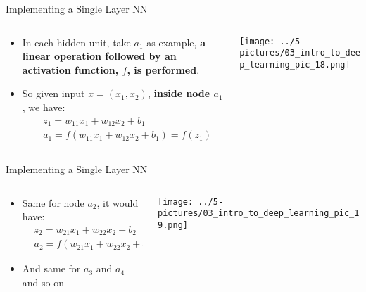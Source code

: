 \documentclass[11pt]{beamer}
\begin{document}
\begin{frame}{Implementing a Single Layer NN}
\begin{columns}[T] %
\begin{column}{.48\textwidth}
\begin{itemize}
\item In each hidden unit, take $a_1$ as example, \textbf{a linear operation followed by an activation function, $f$, is performed}. 
\item So given input $x = (x_1, x_2)$, \textbf{inside node $a_1$}, we have:
\begin{align*}
&z_1 = w_{11}x_1 + w_{12}x_2 + b_1 \\
&a_1 = f(w_{11}x_1 + w_{12}x_2 + b_1) = f(z_1) 
\end{align*}
\end{itemize}
\end{column}%
\hfill%
\begin{column}{.48\textwidth}
        \texttt{[image: ../5-pictures/03\_intro\_to\_deep\_learning\_pic\_18.png]}
\end{column}%
\end{columns}
\end{frame}
\begin{frame}{Implementing a Single Layer NN}
\begin{columns}[T] %
\begin{column}{.48\textwidth}
\begin{itemize}
\item Same for node $a_2$, it would have:
\begin{align*}
&z_2 = w_{21}x_1 + w_{22}x_2 + b_2    \\
&a_2  = f(w_{21}x_1 + w_{22}x_2 + b_2) = f(z_2) 
\end{align*}	
\item And same for $a_3$ and $a_4$ and so on

\end{itemize}
\end{column}%
\hfill%
\begin{column}{.48\textwidth}
        \texttt{[image: ../5-pictures/03\_intro\_to\_deep\_learning\_pic\_19.png]}
\end{column}%
\end{columns}
\end{frame}
\end{document}
